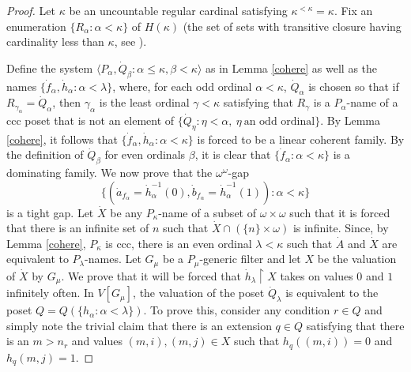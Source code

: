 \documentclass{amsart}
\theoremstyle{definition}
\theoremstyle{remark}
\begin{document}
\begin{proof} 
Let $\kappa$ be an uncountable regular cardinal satisfying $\kappa^{<\kappa}=\kappa$.
 Fix an enumeration $\{ R_\alpha : \alpha < \kappa\}$ of
   $H(\kappa)$ (the set of sets with transitive closure having cardinality
    less than $\kappa$, see \cite{BaumHandbk}).  

 Define the system $\langle P_\alpha, \dot Q_\beta : \alpha \leq \kappa,
\beta <\kappa\rangle$ as in  Lemma \ref{cohere} 
as well as the names
   $\{ \dot f_\alpha , \dot h_\alpha : \alpha < \lambda \}$, where,
   for each odd ordinal $\alpha<\kappa$,
    $\dot Q_\alpha$ is chosen so that if $R_{\gamma_\alpha} = \dot Q_\alpha$,
    then $\gamma_\alpha$ is the least ordinal $\gamma<\kappa$ satisfying
    that $R_{\gamma}$ is a $P_\alpha$-name of a ccc poset
    that is not an element of $\{ \dot Q_\eta : \eta < \alpha, \ \eta\
    \mbox{an odd ordinal}\}$. By Lemma \ref{cohere}, it follows
    that $\{ \dot f_\alpha , \dot h_\alpha : \alpha < \kappa\}$
    is forced to be a linear coherent family. By the definition
    of $\dot Q_\beta$ for even ordinals $\beta$, it is clear
    that $\{ \dot f_\alpha : \alpha < \kappa\}$ is a dominating
    family. We now prove that the $\omega^\omega$-gap
     $$\{ (\dot a_{f_\alpha} = \dot h_\alpha^{-1}(0),
      \dot b_{f_\alpha} = \dot h_\alpha^{-1}(1)) : \alpha <\kappa\}$$ 
    is a tight gap. Let $\dot X$ be any $P_\kappa$-name of 
    a subset of $\omega\times\omega$ such
    that it is forced that there is an
    infinite set of $n$ such
    that $\dot X\cap \left(\{n\}\times\omega\right)$
    is infinite.       
    Since, by Lemma \ref{cohere}, $P_\kappa$ is ccc, there
    is an even ordinal  $\lambda<\kappa$ such that $\dot A$ and $\dot X$
    are equivalent to $P_\lambda$-names. 
    Let $G_\mu$ be a $P_\mu$-generic filter and let $X$
    be the valuation of $\dot X$ by $G_\mu$.
    We prove that
    it will be forced that $\dot h_\lambda \restriction X$
    takes on values $0$ and $1$ infinitely often. 
    In $V[G_\mu]$, the valuation of the poset
     $\dot Q_\lambda$ is equivalent to the poset
      $Q = Q(\{ h_\alpha : \alpha < \lambda\})$. 
      To prove this, consider any condition $r\in Q$
      and simply note the trivial claim
      that there is an extension $q\in Q$
      satisfying that there is an $m>n_r$ and
       values $(m,i),(m,j)\in X$ such
       that $h_q((m,i))=0$ and $h_q(m,j)=1$.
       
       
       


\end{proof}
\end{document}
